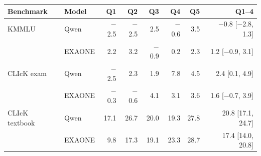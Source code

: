 \begin{tabular}{@{}llrrrrrr@{}}
\toprule
Benchmark & Model & Q1 & Q2 & Q3 & Q4 & Q5 & Q1--4 \\
\midrule
KMMLU & Qwen & $-$2.5 & $-$2.5 & 2.5 & $-$0.6 & 3.5 & $-$0.8 {\scriptsize[$-$2.8, 1.3]} \\
 & EXAONE & 2.2 & 3.2 & $-$0.9 & 0.2 & 2.3 & 1.2 {\scriptsize[$-$0.9, 3.1]} \\
CLIcK exam & Qwen & $-$2.5 & 2.3 & 1.9 & 7.8 & 4.5 & 2.4 {\scriptsize[0.1, 4.9]} \\
 & EXAONE & $-$0.3 & $-$0.6 & 4.1 & 3.1 & 3.6 & 1.6 {\scriptsize[$-$0.7, 3.9]} \\
CLIcK textbook & Qwen & 17.1 & 26.7 & 20.0 & 19.3 & 27.8 & 20.8 {\scriptsize[17.1, 24.7]} \\
 & EXAONE & 9.8 & 17.3 & 19.1 & 23.3 & 28.7 & 17.4 {\scriptsize[14.0, 20.8]} \\
\bottomrule
\end{tabular}
